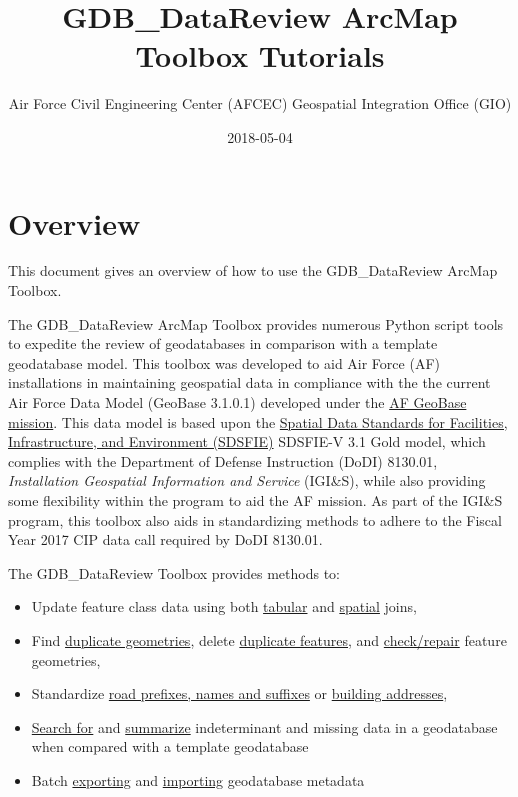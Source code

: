 \documentclass[openany]{book}
\title{GDB\_DataReview ArcMap Toolbox Tutorials}
\author{Air Force Civil Engineering Center (AFCEC) Geospatial Integration Office
(GIO)}
\date{2018-05-04}
\providecommand{\tightlist}{%
  \setlength{\itemsep}{0pt}\setlength{\parskip}{0pt}}
\theoremstyle{definition}
\theoremstyle{definition}
\theoremstyle{definition}
\theoremstyle{remark}
\begin{document}
\maketitle

{
\setcounter{tocdepth}{0}
\tableofcontents
}
\mainmatter

\chapter{Overview}\label{overview}

This document gives an overview of how to use the GDB\_DataReview ArcMap
Toolbox.

The GDB\_DataReview ArcMap Toolbox provides numerous Python script tools
to expedite the review of geodatabases in comparison with a template
geodatabase model. This toolbox was developed to aid Air Force (AF)
installations in maintaining geospatial data in compliance with the the
current Air Force Data Model (GeoBase 3.1.0.1) developed under the
\href{https://www.sdsfieonline.org/Components/USAF}{AF GeoBase mission}.
This data model is based upon the
\href{https://www.sdsfieonline.org/}{Spatial Data Standards for
Facilities, Infrastructure, and Environment (SDSFIE)} SDSFIE-V 3.1 Gold
model, which complies with the Department of Defense Instruction (DoDI)
8130.01, \emph{Installation Geospatial Information and Service}
(IGI\&S), while also providing some flexibility within the program to
aid the AF mission. As part of the IGI\&S program, this toolbox also
aids in standardizing methods to adhere to the Fiscal Year 2017 CIP data
call required by DoDI 8130.01.

The GDB\_DataReview Toolbox provides methods to:

\begin{itemize}
\tightlist
\item
  Update feature class data using both
  \protect\hyperlink{joinCalc}{tabular} and
  \protect\hyperlink{spatjoinCalc}{spatial} joins,
\item
  Find \protect\hyperlink{dupGeom}{duplicate geometries}, delete
  \protect\hyperlink{dupFeats}{duplicate features}, and
  \protect\hyperlink{chkGeom}{check/repair} feature geometries,
\item
  Standardize \protect\hyperlink{std3}{road prefixes, names and
  suffixes} or \protect\hyperlink{stdAdd1}{building addresses},
\item
  \protect\hyperlink{indtSearch}{Search for} and
  \protect\hyperlink{summIndt}{summarize} indeterminant and missing data
  in a geodatabase when compared with a template geodatabase
\item
  Batch \protect\hyperlink{exMeta}{exporting} and
  \protect\hyperlink{imMeta}{importing} geodatabase metadata
\end{itemize}
\end{document}
